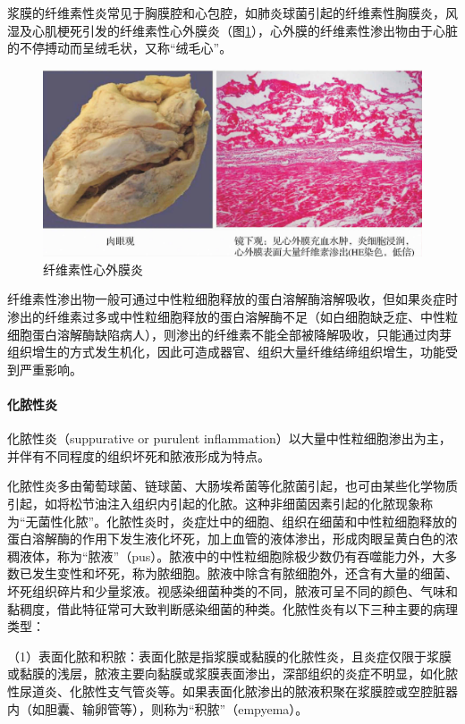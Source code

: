 浆膜的纤维素性炎常见于胸膜腔和心包腔，如肺炎球菌引起的纤维素性胸膜炎，风湿及心肌梗死引发的纤维素性心外膜炎（图\ref{fig4-8}），心外膜的纤维素性渗出物由于心脏的不停搏动而呈绒毛状，又称“绒毛心”。

\begin{figure}[!htbp]
  \centering
  \includegraphics{./images/Image00059.jpg}
  \caption{纤维素性心外膜炎}
  \label{fig4-8}
\end{figure}

纤维素性渗出物一般可通过中性粒细胞释放的蛋白溶解酶溶解吸收，但如果炎症时渗出的纤维素过多或中性粒细胞释放的蛋白溶解酶不足（如白细胞缺乏症、中性粒细胞蛋白溶解酶缺陷病人），则渗出的纤维素不能全部被降解吸收，只能通过肉芽组织增生的方式发生机化，因此可造成器官、组织大量纤维结缔组织增生，功能受到严重影响。

\paragraph{化脓性炎}
化脓性炎（suppurative or purulent
inflammation）以大量中性粒细胞渗出为主，并伴有不同程度的组织坏死和脓液形成为特点。

化脓性炎多由葡萄球菌、链球菌、大肠埃希菌等化脓菌引起，也可由某些化学物质引起，如将松节油注入组织内引起的化脓。这种非细菌因素引起的化脓现象称为“无菌性化脓”。化脓性炎时，炎症灶中的细胞、组织在细菌和中性粒细胞释放的蛋白溶解酶的作用下发生液化坏死，加上血管的液体渗出，形成肉眼呈黄白色的浓稠液体，称为“脓液”（pus）。脓液中的中性粒细胞除极少数仍有吞噬能力外，大多数已发生变性和坏死，称为脓细胞。脓液中除含有脓细胞外，还含有大量的细菌、坏死组织碎片和少量浆液。视感染细菌种类的不同，脓液可呈不同的颜色、气味和黏稠度，借此特征常可大致判断感染细菌的种类。化脓性炎有以下三种主要的病理类型：

（1）表面化脓和积脓：表面化脓是指浆膜或黏膜的化脓性炎，且炎症仅限于浆膜或黏膜的浅层，脓液主要向黏膜或浆膜表面渗出，深部组织的炎症不明显，如化脓性尿道炎、化脓性支气管炎等。如果表面化脓渗出的脓液积聚在浆膜腔或空腔脏器内（如胆囊、输卵管等），则称为“积脓”（empyema）。

